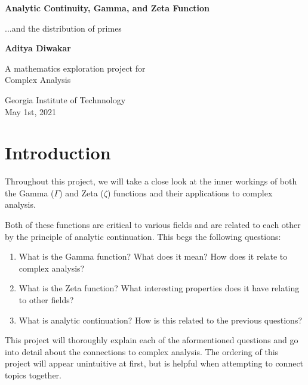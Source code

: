 \documentclass[14pt]{extarticle}
\begin{document}
\begin{titlepage}
   \begin{center}
       \vspace*{1cm}

       \textbf{\LARGE Analytic Continuity, Gamma, and Zeta Function}

       \vspace{0.5cm}
       {\Large ...and the distribution of primes}
            
       \vspace{1.5cm}

       \textbf{\Large Aditya Diwakar}

       \vfill
            
       \large{A mathematics exploration project for\\
       Complex Analysis
            
       \vspace{0.8cm}
     
       Georgia Institute of Technnology\\
       May 1st, 2021}
            
   \end{center}
\end{titlepage}

\section{Introduction}

Throughout this project, we will take a close look at the inner workings of both the Gamma ($\Gamma$) and Zeta ($\zeta$) functions and their applications to complex analysis. 

Both of these functions are critical to various fields and are related to each other by the principle of analytic continuation. This begs the following questions:
\begin{enumerate}[label=(\arabic*)]
	\item What is the Gamma function? What does it mean? How does it relate to complex analysis?
	\item What is the Zeta function? What interesting properties does it have relating to other fields?
 	\item What is analytic continuation? How is this related to the previous questions?
\end{enumerate}

\noindent
This project will thoroughly explain each of the aformentioned questions and go into detail
about the connections to complex analysis. The ordering of this project will appear 
unintuitive at first, but is helpful when attempting to connect topics together. 
\end{document}
